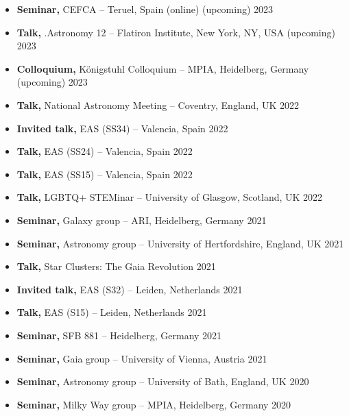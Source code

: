 \documentclass[12pt, letterpaper]{hunt-cv}
\begin{document}
\begin{itemize}
    \item \textbf{Seminar,} CEFCA -- Teruel, Spain (online) \hfill (upcoming) 2023
    \item \textbf{Talk,} .Astronomy 12 -- Flatiron Institute, New York, NY, USA \hfill (upcoming) 2023
    \item \textbf{Colloquium,} Königstuhl Colloquium -- MPIA, Heidelberg, Germany \hfill (upcoming) 2023
    \item \textbf{Talk,} National Astronomy Meeting -- Coventry, England, UK \hfill 2022
    \item \textbf{Invited talk,} EAS (SS34) -- Valencia, Spain \hfill 2022
    \item \textbf{Talk,} EAS (SS24) -- Valencia, Spain \hfill 2022
    \item \textbf{Talk,} EAS (SS15) -- Valencia, Spain \hfill 2022
    \item \textbf{Talk,} LGBTQ+ STEMinar  -- University of Glasgow, Scotland, UK \hfill 2022
    \item \textbf{Seminar,} Galaxy group -- ARI, Heidelberg, Germany \hfill 2021
    \item \textbf{Seminar,} Astronomy group -- University of Hertfordshire, England, UK \hfill 2021
    \item \textbf{Talk,} Star Clusters: The Gaia Revolution \hfill 2021
    \item \textbf{Invited talk,} EAS (S32) -- Leiden, Netherlands \hfill 2021
    \item \textbf{Talk,} EAS (S15) -- Leiden, Netherlands \hfill 2021
    \item \textbf{Seminar,} SFB 881 -- Heidelberg, Germany \hfill 2021
    \item \textbf{Seminar,} Gaia group -- University of Vienna, Austria \hfill 2021
    \item \textbf{Seminar,} Astronomy group -- University of Bath, England, UK \hfill 2020
    \item \textbf{Seminar,} Milky Way group -- MPIA, Heidelberg, Germany \hfill 2020
\end{itemize}


\end{document}
